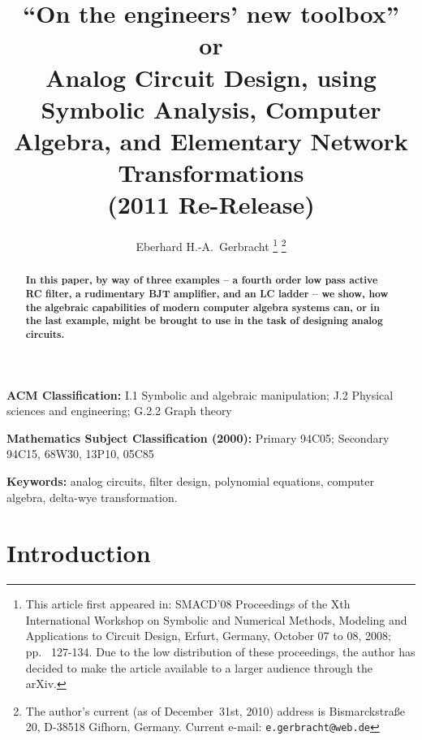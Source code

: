 \documentclass[10pt,twocolumn,pagenumbers]{IEEEtran}
\begin{document}
\title{\Large ``On the engineers' new toolbox''\\
or\\
Analog Circuit Design, using Symbolic Analysis, Computer Algebra, and Elementary Network Transformations\\
{\large (2011 Re-Release)}
}

\author{{\large Eberhard H.-A.\ Gerbracht
\thanks{This article first appeared in: SMACD'08 Proceedings of the Xth International Workshop on Symbolic and Numerical Methods, Modeling and Applications to Circuit Design, Erfurt, Germany, October 07 to 08, 2008; pp.~ 127-134. Due to the low distribution of these proceedings, the author has decided to make the article available to a larger audience through the arXiv.}
\thanks{The author's current (as of December~31st, 2010) address is Bismarckstra\ss e 20, D-38518 Gifhorn, Germany. Current e-mail: \tt{e.gerbracht@web.de}}}}
 
\maketitle
\thispagestyle{empty}

\bigskip

\begin{abstract}
\noindent
{\small \bf
In this paper, by way of three examples -- a fourth order low pass active RC filter, a rudimentary BJT amplifier, and an LC ladder -- we show, how the algebraic capabilities of modern computer algebra systems can, or in the last example, might be brought to use in the task of designing analog circuits.
}
\end{abstract}


{\small
\noindent
{\bf ACM Classification:} I.1 Symbolic and algebraic manipulation; J.2 Physical sciences and engineering; G.2.2 Graph theory
\smallskip

\noindent
{\bf Mathematics Subject Classification (2000):} Primary 94C05; Secondary 94C15, 68W30, 13P10, 05C85
\smallskip

\noindent
{\bf Keywords:} analog circuits, filter design, polynomial equations, computer algebra, delta-wye transformation.
}

\section{Introduction}
\end{document}

